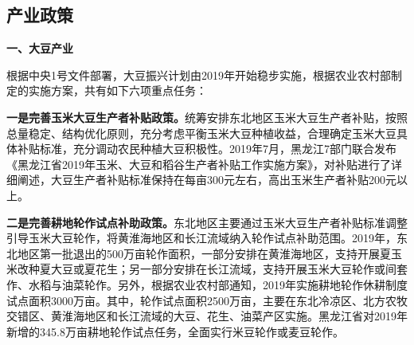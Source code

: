 \documentclass{progbookcn}
\begin{document}
\begin{table}[]
\centering
{}
\end{table}

\subsection{产业政策}
\textbf{一、大豆产业}

根据中央1号文件部署，大豆振兴计划由2019年开始稳步实施，根据农业农村部制定的实施方案，共有如下六项重点任务：

\textbf{一是完善玉米大豆生产者补贴政策。}统筹安排东北地区玉米大豆生产者补贴，按照总量稳定、结构优化原则，充分考虑平衡玉米大豆种植收益，合理确定玉米大豆具体补贴标准，充分调动农民种植大豆积极性。2019年7月，黑龙江7部门联合发布《黑龙江省2019年玉米、大豆和稻谷生产者补贴工作实施方案》，对补贴进行了详细阐述，大豆生产者补贴标准保持在每亩300元左右，高出玉米生产者补贴200元以上。

\textbf{二是完善耕地轮作试点补助政策。}东北地区主要通过玉米大豆生产者补贴标准调整引导玉米大豆轮作，将黄淮海地区和长江流域纳入轮作试点补助范围。2019年，东北地区第一批退出的500万亩轮作面积，一部分安排在黄淮海地区，支持开展夏玉米改种夏大豆或夏花生；另一部分安排在长江流域，支持开展玉米大豆轮作或间套作、水稻与油菜轮作。另外，根据农业农村部通知，2019年实施耕地轮作休耕制度试点面积3000万亩。其中，轮作试点面积2500万亩，主要在东北冷凉区、北方农牧交错区、黄淮海地区和长江流域的大豆、花生、油菜产区实施。黑龙江省对2019年新增的345.8万亩耕地轮作试点任务，全面实行米豆轮作或麦豆轮作。
\end{document}
